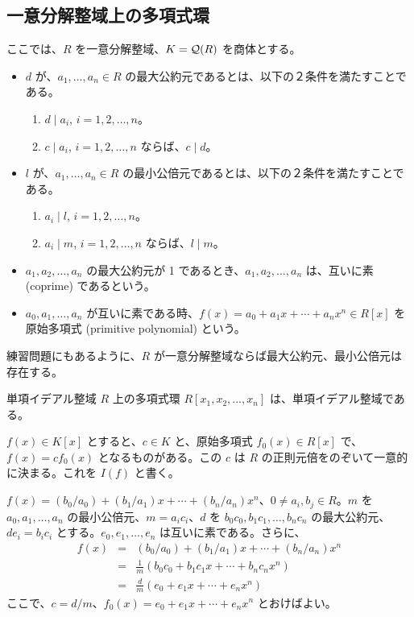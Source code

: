 \subsection{一意分解整域上の多項式環}
ここでは、$R$ を一意分解整域、$K = {\cal Q}(R)$ を商体とする。

\begin{itemize}
\item $d$ が、$a_1, \ldots, a_n\in R$ の最大公約元であるとは、以下の２条件を満たすことである。
	\begin{enumerate}
	\item $d\mid a_i$, $i = 1, 2,\ldots, n$。
	\item $c\mid a_i$, $i = 1, 2, \ldots, n$ ならば、$c\mid d$。
	\end{enumerate}
\item $l$ が、$a_1, \ldots, a_n\in R$ の最小公倍元であるとは、以下の２条件を満たすことである。
	\begin{enumerate}
	\item $a_i\mid l$, $i = 1, 2,\ldots, n$。
	\item $a_i\mid m$, $i = 1, 2, \ldots, n$ ならば、$l\mid m$。
	\end{enumerate}
\item $a_1, a_2, \ldots, a_n$ の最大公約元が 1 であるとき、$a_1, a_2, \ldots, a_n$ は、互いに素 (coprime) であるという。
\item $a_0, a_1, \ldots, a_n$ が互いに素である時、$f(x) = a_0 + a_1x + \cdots + a_nx^n\in R[x]$ を原始多項式 (primitive polynomial) という。
\end{itemize}

練習問題にもあるように、$R$ が一意分解整域ならば最大公約元、最小公倍元は存在する。

\begin{thm} \label{thm:poly_ufd}
単項イデアル整域 $R$ 上の多項式環 $R[x_1,x_2,\ldots,x_n]$ は、単項イデアル整域である。
\end{thm}

\begin{lemma} \label{lemma:inhalt}
$f(x)\in K[x]$ とすると、$c\in K$ と、原始多項式 $f_0(x)\in R[x]$ で、$f(x) = cf_0(x)$ となるものがある。この $c$ は $R$ の正則元倍をのぞいて一意的に決まる。これを $I(f)$ と書く。
\end{lemma}
\proof
$f(x) = (b_0/a_0) + (b_1/a_1)x + \cdots + (b_n/a_n)x^n$、$0\neq a_i, b_j\in R$。$m$ を $a_0, a_1, \ldots, a_n$ の最小公倍元、$m = a_ic_i$、$d$ を $b_0c_0, b_1c_1, \ldots, b_nc_n$ の最大公約元、$de_i = b_ic_i$ とする。$e_0, e_1, \ldots, e_n$ は互いに素である。さらに、
\begin{eqnarray*}
f(x) & = & (b_0/a_0) + (b_1/a_1)x + \cdots + (b_n/a_n)x^n\\
	& = & \frac1m(b_0c_0 + b_1c_1x + \cdots + b_nc_nx^n)\\
	& = & \frac dm(e_0 + e_1x + \cdots + e_nx^n)
\end{eqnarray*}
ここで、$c = d/m$、$f_0(x) = e_0 + e_1x + \cdots + e_nx^n$ とおけばよい。

